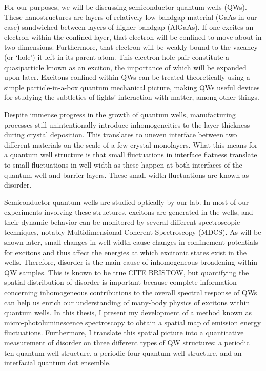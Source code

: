 \indent For our purposes, we will be discussing semiconductor quantum wells (QWs). These nanostructures are layers of relatively low bandgap material (GaAs in our case) sandwiched between layers of higher bandgap (AlGaAs). If one excites an electron within the confined layer, that electron will be confined to move about in two dimensions. Furthermore, that electron will be weakly bound to the vacancy (or `hole') it left in its parent atom. This electron-hole pair constitute a quasiparticle known as an exciton, the importance of which will be expanded upon later. Excitons confined within QWs can be treated theoretically using a simple particle-in-a-box quantum mechanical picture, making QWs useful devices for studying the subtleties of lights' interaction with matter, among other things.

\indent Despite immense progress in the growth of quantum wells, manufacturing processes still unintentionally introduce inhomogeneities to the layer thickness during crystal deposition. This translates to uneven interface between two different materials on the scale of a few crystal monolayers. What this means for a quantum well structure is that small fluctuations in interface flatness translate to small fluctuations in well width as these happen at both interfaces of the quantum well and barrier layers. These small width fluctuations are known as disorder.

\indent Semiconductor quantum wells are studied optically by our lab. In most of our experiments involving these structures, excitons are generated in the wells, and their dynamic behavior can be monitored by several different spectroscopic techniques, notably Multidimensional Coherent Spectroscopy (MDCS). As will be shown later, small changes in well width cause changes in confinement potentials for excitons and thus affect the energies at which excitonic states exist in the wells. Therefore, disorder is the main cause of inhomogeneous broadening within QW samples. This is known to be true CITE BRISTOW, but quantifying the spatial distribution of disorder is important because complete information concerning inhomogeneous contributions to the overall spectral response of QWs can help us enrich our understanding of many-body physics of excitons within quantum wells. In this thesis, I present my development of a method known as micro-photoluminescence spectroscopy to obtain a spatial map of emission energy fluctuations. Furthermore, I translate this spatial picture into a quantitative measurement of disorder on three different types of QW structures: a periodic ten-quantum well structure, a periodic four-quantum well structure, and an interfacial quantum dot ensemble. 

